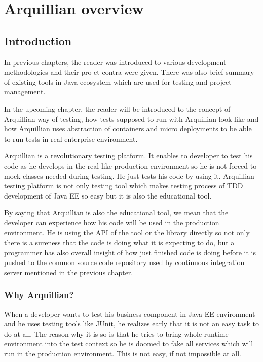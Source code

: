 \documentclass[12pt,final,oneside]{fithesis}
\begin{document}
\chapter{Arquillian overview}

	\section{Introduction}

In previous chapters, the reader was introduced to various development methodologies and their pro et contra were given. There was also brief summary of existing tools in Java ecosystem which are used for testing and project management.

In the upcoming chapter, the reader will be introduced to the concept of Arquillian way of testing, how tests supposed to run with Arquillian look like and how Arquillian uses abstraction of containers and micro deployments to be able to run tests in real enterprise environment.

Arquillian is a revolutionary testing platform. It enables to developer to test his code as he develops in the real-like production environment so he is not forced to mock classes needed during testing. He just tests his code by using it. Arquillian testing platform is not only testing tool which makes testing process of TDD development of Java EE so easy but it is also the educational tool.

By saying that Arquillian is also the educational tool, we mean that the developer can experience how his code will be used in the production environment. He is using the API of the tool or the library directly so not only there is a sureness that the code is doing what it is expecting to do, but a programmer has also overall insight of how just finished code is doing before it is pushed to the common source code repository used by continuous integration server mentioned in the previous chapter.

	\subsection{Why Arquillian?}

When a developer wants to test his business component in Java EE environment and he uses testing tools like JUnit, he realizes early that it is not an easy task to do at all. The reason why it is so is that he tries to bring whole runtime environment into the test context so he is doomed to fake all services which will run in the production environment. This is not easy, if not impossible at all.
\end{document}
